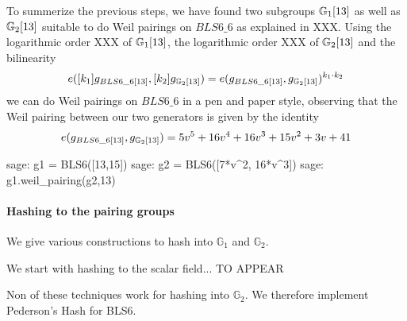 To summerize the previous steps, we have found two subgroups $\mathbb{G}_1[13]$ as well as $\mathbb{G}_2[13]$ suitable to do Weil pairings on $BLS6\_6$ as explained in XXX. Using the logarithmic order XXX of $\mathbb{G}_1[13]$, the logarithmic order XXX of $\mathbb{G}_2[13]$ and the bilinearity 
$$
e([k_1]g_{BLS6\_6[13]},[k_2]g_{\mathbb{G}_2[13]}) = 
e(g_{BLS6\_6[13]},g_{\mathbb{G}_2[13]})^{k_1\cdot k_2}
$$
we can do Weil pairings on $BLS6\_6$ in a pen and paper style, observing that the Weil pairing between our two generators is given by the identity
$$
e(g_{BLS6\_6[13]},g_{\mathbb{G}_2[13]})= 5v^5 + 16v^4 + 16v^3 + 15v^2 + 3v + 41
$$
\begin{sagecommandline}
sage: g1 = BLS6([13,15])
sage: g2 = BLS6([7*v^2, 16*v^3])
sage: g1.weil_pairing(g2,13)
\end{sagecommandline}
\paragraph{Hashing to the pairing groups}
We give various constructions to hash into $\mathbb{G}_1$ and $\mathbb{G}_2$. 

We start with hashing to the scalar field... TO APPEAR

Non of these techniques work for hashing into $\mathbb{G}_2$. We therefore implement Pederson's Hash for BLS6. 

